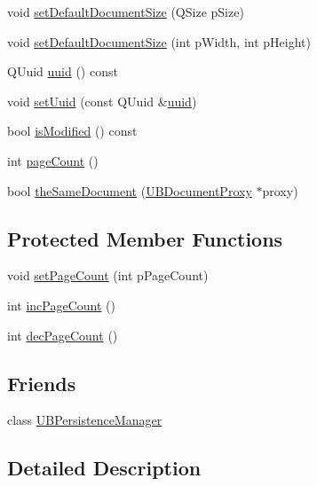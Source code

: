 \begin{DoxyCompactItemize}
\item 
void \hyperlink{class_u_b_document_proxy_a956c4570c8f97908895dd5169e3a8af1}{set\-Default\-Document\-Size} (Q\-Size p\-Size)
\item 
void \hyperlink{class_u_b_document_proxy_a3368fc01d9506176f01616f035231017}{set\-Default\-Document\-Size} (int p\-Width, int p\-Height)
\item 
Q\-Uuid \hyperlink{class_u_b_document_proxy_aa7e2c218977544f65bf842dc42197a6a}{uuid} () const 
\item 
void \hyperlink{class_u_b_document_proxy_a029188b2c67889594af3057c06cb5217}{set\-Uuid} (const Q\-Uuid \&\hyperlink{class_u_b_document_proxy_aa7e2c218977544f65bf842dc42197a6a}{uuid})
\item 
bool \hyperlink{class_u_b_document_proxy_a5616a9b21de8f24ca6605a05f792b387}{is\-Modified} () const 
\item 
int \hyperlink{class_u_b_document_proxy_a464a6a010deaeab87070628041bb7c0e}{page\-Count} ()
\item 
bool \hyperlink{class_u_b_document_proxy_a79709d748149db076173b8996c544393}{the\-Same\-Document} (\hyperlink{class_u_b_document_proxy}{U\-B\-Document\-Proxy} $\ast$proxy)
\end{DoxyCompactItemize}
\subsection*{Protected Member Functions}
\begin{DoxyCompactItemize}
\item 
void \hyperlink{class_u_b_document_proxy_ae2756a1f873f485576df9a1dae94e94c}{set\-Page\-Count} (int p\-Page\-Count)
\item 
int \hyperlink{class_u_b_document_proxy_a14b9161a9b26e1d090f4d1df3818b165}{inc\-Page\-Count} ()
\item 
int \hyperlink{class_u_b_document_proxy_a54d51ea0a38ff8af43e86cc4a289de3f}{dec\-Page\-Count} ()
\end{DoxyCompactItemize}
\subsection*{Friends}
\begin{DoxyCompactItemize}
\item 
class \hyperlink{class_u_b_document_proxy_a5f897416511abe617c56d086f54e4b3e}{U\-B\-Persistence\-Manager}
\end{DoxyCompactItemize}


\subsection{Detailed Description}



